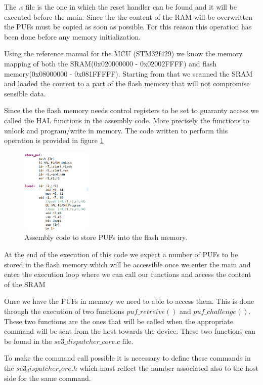 The .s file is the one in which the reset handler can be found and it will be executed before the main. Since the the content of the RAM will be overwritten the PUFs must be copied as soon as possible. For this reason this operation has been done before any memory initialization.

Using the reference manual for the MCU (STM32f429) we know the memory mapping of both the SRAM(0x020000000 -  0x02002FFFF) and flash memory(0x08000000 - 0x081FFFFF). Starting from that we scanned the SRAM and loaded the content to a part of the flash memory that will not compromise sensible data.

Since the the flash memory needs control registers to be set to guaranty access we called the HAL functions in the assembly code. More precisely the functions to unlock and program/write in memory. The code written to perform this operation is provided in figure \ref{fig:code_assembly}

\begin{figure}[h!]
	\vspace{0.5cm}
	\includegraphics[width = 0.3\textwidth]{images/code_assembly.png}
	\caption{Assembly code to store PUFs into the flash memory. }
	\label{fig:code_assembly}
\end{figure}

At the end of the execution of this code we expect a number of PUFs to be stored in the flash memory which will be accessible once we enter the main and enter the execution loop where we can call our functions and access the content of the SRAM

Once we have the PUFs in memory we need to able to access them. This is done through the execution of two functions $puf\_retreive()$ and $puf\_challenge()$. These two functions are the ones that will be called when the appropriate command will be sent from the host towards the device. These two functions can be found in the $se3\_dispatcher\_core.c$ file.

To make the command call possible it is necessary to define these commands in the $se3_dispatcher_core.h$ which must reflect the number associated also to the host side for the same command.

